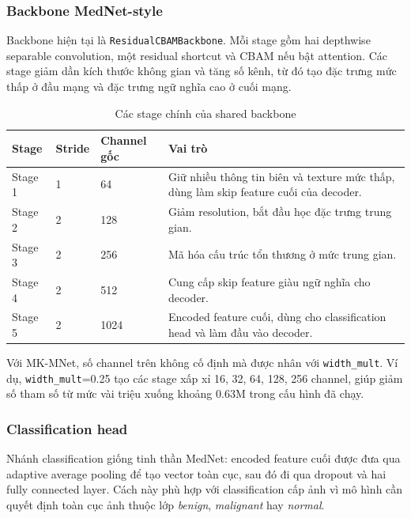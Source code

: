 \documentclass[12pt,a4paper]{article}
\begin{document}
\subsubsection*{Backbone MedNet-style}

Backbone hiện tại là \texttt{ResidualCBAMBackbone}. Mỗi stage gồm hai depthwise separable convolution, một residual shortcut và CBAM nếu bật attention. Các stage giảm dần kích thước không gian và tăng số kênh, từ đó tạo đặc trưng mức thấp ở đầu mạng và đặc trưng ngữ nghĩa cao ở cuối mạng.

\begin{table}[H]
\centering
\caption{Các stage chính của shared backbone}
\renewcommand{\arraystretch}{1.25}
\begin{tabular}{p{2.2cm} p{2.4cm} p{2.6cm} p{6.8cm}}
\toprule
\textbf{Stage} & \textbf{Stride} & \textbf{Channel gốc} & \textbf{Vai trò} \\
\midrule
Stage 1 & 1 & 64 & Giữ nhiều thông tin biên và texture mức thấp, dùng làm skip feature cuối của decoder. \\
Stage 2 & 2 & 128 & Giảm resolution, bắt đầu học đặc trưng trung gian. \\
Stage 3 & 2 & 256 & Mã hóa cấu trúc tổn thương ở mức trung gian. \\
Stage 4 & 2 & 512 & Cung cấp skip feature giàu ngữ nghĩa cho decoder. \\
Stage 5 & 2 & 1024 & Encoded feature cuối, dùng cho classification head và làm đầu vào decoder. \\
\bottomrule
\end{tabular}
\end{table}

Với MK-MNet, số channel trên không cố định mà được nhân với \texttt{width\_mult}. Ví dụ, \texttt{width\_mult}=0.25 tạo các stage xấp xỉ 16, 32, 64, 128, 256 channel, giúp giảm số tham số từ mức vài triệu xuống khoảng 0.63M trong cấu hình đã chạy.

\subsubsection*{Classification head}

Nhánh classification giống tinh thần MedNet: encoded feature cuối được đưa qua adaptive average pooling để tạo vector toàn cục, sau đó đi qua dropout và hai fully connected layer. Cách này phù hợp với classification cấp ảnh vì mô hình cần quyết định toàn cục ảnh thuộc lớp \textit{benign}, \textit{malignant} hay \textit{normal}.
\end{document}
